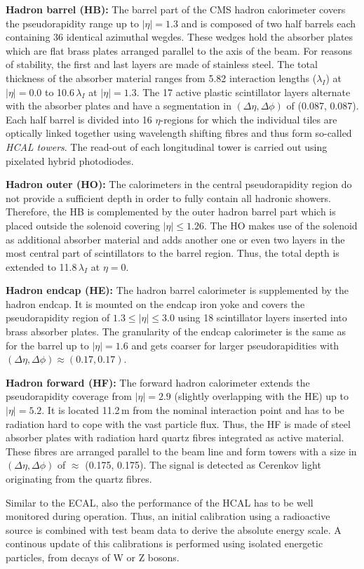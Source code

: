 \begin{description}
 \item \textbf{Hadron barrel (HB):} The barrel part of the CMS hadron calorimeter covers the pseudorapidity range up to $|\eta| = 1.3$ and is composed of two half barrels each containing 36 identical azimuthal wegdes. These wedges hold the absorber plates which are flat brass plates arranged parallel to the axis of the beam. For reasons of stability, the first and last layers are made of stainless steel. The total thickness of the absorber material ranges from 5.82 interaction lengths ($\lambda_I$) at $|\eta| = 0.0$ to 10.6\,$\lambda_I$ at $|\eta| = 1.3$. The 17 active plastic scintillator layers alternate with the absorber plates and have a segmentation in $(\Delta \eta, \Delta \phi)$ of (0.087, 0.087).\\
Each half barrel is divided into 16 $\eta$-regions for which the individual tiles are optically linked together using wavelength shifting fibres and thus form so-called \textit{HCAL towers}. The read-out of each longitudinal tower is carried out using pixelated hybrid photodiodes.
 \item \textbf{Hadron outer (HO):} The calorimeters in the central pseudorapidity region do not provide a sufficient depth in order to fully contain all hadronic showers. Therefore, the HB is complemented by the outer hadron barrel part which is placed outside the solenoid covering $|\eta| \le 1.26$. The HO makes use of the solenoid as additional absorber material and adds another one or even two layers in the most central part of scintillators to the barrel region. Thus, the total depth is extended to 11.8\,$\lambda_I$ at $\eta = 0$.
 \item \textbf{Hadron endcap (HE):} The hadron barrel calorimeter is supplemented by the hadron endcap. It is mounted on the endcap iron yoke and covers the pseudorapidity region of $1.3 \le |\eta| \le 3.0$ using 18 scintillator layers inserted into brass absorber plates. The granularity of the endcap calorimeter is the same as for the barrel up to $|\eta| = 1.6$ and gets coarser for larger pseudorapidities with $(\Delta \eta, \Delta \phi) \approx (0.17, 0.17)$.
 \item \textbf{Hadron forward (HF):} The forward hadron calorimeter extends the pseudorapidity coverage from $|\eta| = 2.9$ (slightly overlapping with the HE) up to $|\eta| = 5.2$. It is located 11.2\,m from the nominal interaction point and has to be radiation hard to cope with the vast particle flux. Thus, the HF is made of steel absorber plates with radiation hard quartz fibres integrated as active material. These fibres are arranged parallel to the beam line and form towers with a size in $(\Delta \eta, \Delta \phi)$ of $\approx$ (0.175, 0.175). The signal is detected as Cerenkov light originating from the quartz fibres.
\end{description}
Similar to the ECAL, also the performance of the HCAL has to be well monitored during operation. Thus, an initial calibration using a radioactive source is combined with test beam data to derive the absolute energy scale. A continous update of this calibrations is performed using isolated energetic particles, \eg from decays of W or Z bosons. 

